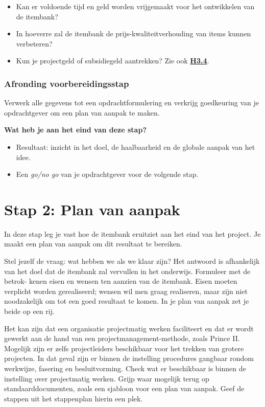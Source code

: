 \documentclass[
]{book}
\providecommand{\tightlist}{%
  \setlength{\itemsep}{0pt}\setlength{\parskip}{0pt}}
\begin{document}
\begin{itemize}
  \begin{itemize}
  \tightlist
  \item
    Kan er voldoende tijd en geld worden vrijgemaakt voor het ontwikkelen van de itembank?
  \item
    In hoeverre zal de itembank de prijs-kwaliteitverhouding van items kunnen verbeteren?
  \item
    Kun je projectgeld of subsidiegeld aantrekken? Zie ook \textbf{\protect\hyperlink{kosten-en-baten}{H3.4}}.
  \end{itemize}
\end{itemize}

\hypertarget{afronding-voorbereidingsstap}{%
\subsubsection{Afronding voorbereidingsstap}\label{afronding-voorbereidingsstap}}

Verwerk alle gegevens tot een opdrachtformulering en verkrijg goedkeuring van je opdrachtgever om een plan van aanpak te maken.

\textbf{Wat heb je aan het eind van deze stap?}

\begin{itemize}
\tightlist
\item
  Resultaat: inzicht in het doel, de haalbaarheid en de globale aanpak van het idee.
\item
  Een \emph{go/no go} van je opdrachtgever voor de volgende stap.
\end{itemize}

\hypertarget{stap-2-plan-van-aanpak}{%
\section{Stap 2: Plan van aanpak}\label{stap-2-plan-van-aanpak}}

In deze stap leg je vast hoe de itembank eruitziet aan het eind van het project. Je maakt een plan van aanpak om dit resultaat te bereiken.

Stel jezelf de vraag: wat hebben we als we klaar zijn? Het antwoord is afhankelijk van het doel dat de itembank zal vervullen in het onderwijs. Formuleer met de betrok- kenen eisen en wensen ten aanzien van de itembank. Eisen moeten verplicht worden gerealiseerd; wensen wil men graag realiseren, maar zijn niet noodzakelijk om tot een goed resultaat te komen. In je plan van aanpak zet je beide op een rij.

Het kan zijn dat een organisatie projectmatig werken faciliteert en dat er wordt gewerkt aan de hand van een projectmanagement-methode, zoals Prince II. Mogelijk zijn er zelfs projectleiders beschikbaar voor het trekken van grotere projecten. In dat geval zijn er binnen de instelling procedures gangbaar rondom werkwijze, fasering en besluitvorming. Check wat er beschikbaar is binnen de instelling over projectmatig werken. Grijp waar mogelijk terug op standaarddocumenten, zoals een sjabloon voor een plan van aanpak. Geef de stappen uit het stappenplan hierin een plek.
\end{document}
